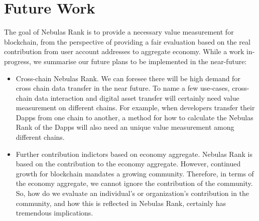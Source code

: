 \section{Future Work}
The goal of Nebulas Rank is to provide a necessary value measurement for blockchain, from the perspective of providing a fair evaluation based on the real contribution from user account addresses to aggregate economy. While a work in-progress, we summarise our future plans to be implemented in the near-future:
\begin{itemize}
\item{Cross-chain Nebulas Rank.} We can foresee there will be high demand for cross chain data transfer in the near future. To name a few use-cases, cross-chain data interaction and digital asset transfer will certainly need value measurement on different chains. For example, when developers transfer their Dapps from one chain to another, a method for how to calculate the Nebulas Rank of the Dapps will also need an unique value measurement among different chains.
\item{Further contribution indictors based on economy aggregate.} Nebulas Rank is based on the contribution to the economy aggregate. However, continued growth for blockchain mandates a growing community. Therefore, in terms of the economy aggregate, we cannot ignore the contribution of the community. So, how do we evaluate an individual’s or organization’s contribution in the community, and how this is reflected in Nebulas Rank, certainly has tremendous implications.


\end{itemize}
